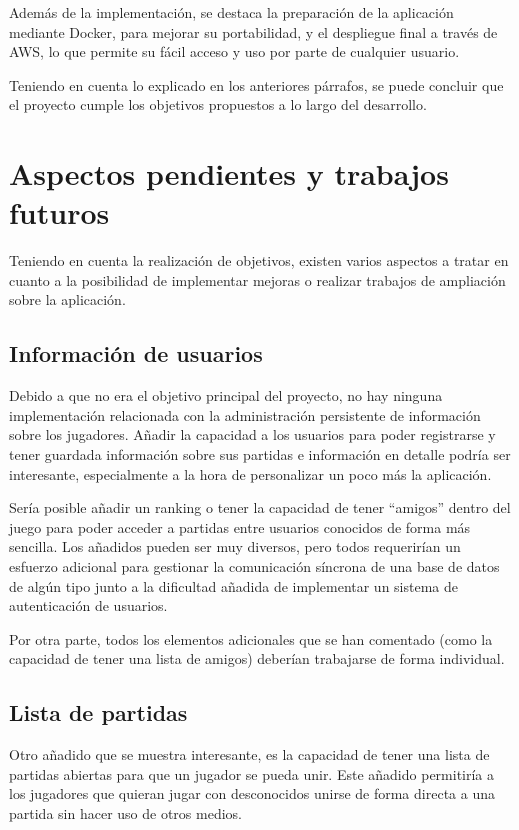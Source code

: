 Además de la implementación, se destaca la preparación de la aplicación mediante Docker, 
para mejorar su portabilidad, y el despliegue final a través de AWS, 
lo que permite su fácil acceso y uso por parte de cualquier usuario.

Teniendo en cuenta lo explicado en los anteriores párrafos, se puede concluir
que el proyecto cumple los objetivos propuestos a lo largo del desarrollo.



\section{Aspectos pendientes y trabajos futuros}

Teniendo en cuenta la realización de objetivos, existen varios aspectos a tratar en cuanto a la posibilidad
de implementar mejoras o realizar trabajos de ampliación sobre la aplicación.

\subsection{Información de usuarios}
Debido a que no era el objetivo principal del proyecto, no hay ninguna implementación relacionada con la administración
persistente de información sobre los jugadores. Añadir la capacidad a los usuarios para poder registrarse y tener guardada
información sobre sus partidas e información en detalle podría ser interesante, especialmente a la hora de personalizar
un poco más la aplicación.

Sería posible añadir un ranking o tener la capacidad de tener ``amigos'' dentro del juego para poder acceder a partidas entre
usuarios conocidos de forma más sencilla. Los añadidos pueden ser muy diversos, pero todos requerirían un esfuerzo adicional 
para gestionar la comunicación síncrona de una base de datos de algún tipo junto
a la dificultad añadida de implementar un sistema de autenticación de usuarios. 

Por otra parte, todos los elementos adicionales
que se han comentado (como la capacidad de tener una lista de amigos) deberían trabajarse de forma individual.

\subsection{Lista de partidas}
Otro añadido que se muestra interesante, es la capacidad de tener una lista de partidas abiertas para que un jugador se pueda
unir. Este añadido permitiría a los jugadores que quieran jugar con desconocidos unirse de forma directa a una partida 
sin hacer uso de otros medios.

